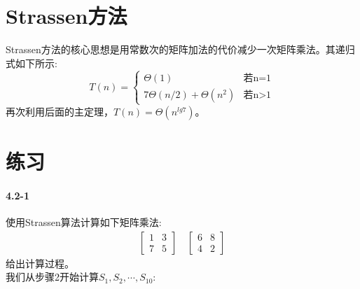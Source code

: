 \documentclass[a4paper,11pt]{article}
\begin{document}
\section*{Strassen方法}
Strassen方法的核心思想是用常数次的矩阵加法的代价减少一次矩阵乘法。其递归式如下所示:
\[
	T(n) = 
	\begin{cases}
		\Theta(1) & \text{若n=1} \\
		7\Theta(n/2) + \Theta(n^2) &\text{若n>1}
	\end{cases}
\]
再次利用后面的主定理，$T(n)=\Theta(n^{lg7})$。
\section*{练习}
\paragraph*{4.2-1}
使用Strassen算法计算如下矩阵乘法:
\[
	\begin{gathered}
		\begin{bmatrix}
			1 & 3\\
			7 & 5
		\end{bmatrix}
		\quad
		\begin{bmatrix}
			6 & 8\\
			4 & 2
		\end{bmatrix}
	\end{gathered}
\]
给出计算过程。\\
我们从步骤2开始计算$S_1,S_2,\cdots,S_{10}$:
\end{document}
